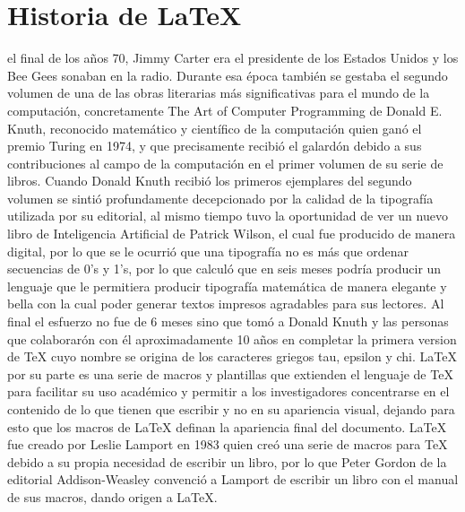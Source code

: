 \documentclass[journal]{IEEEtran}
\begin{document}
\section{Historia de \LaTeX }
% 
% 
% 
% 
 el final de los años 70, Jimmy Carter era el presidente de los Estados Unidos y los Bee Gees sonaban en la radio. Durante esa época también se gestaba el segundo volumen de  una de las obras literarias más significativas para el mundo de la computación, concretamente The Art of Computer Programming de Donald E. Knuth, reconocido matemático y científico de la computación quien ganó el premio Turing en 1974, y que precisamente recibió el galardón debido a sus contribuciones al campo de la computación en el primer volumen de su serie de libros.
Cuando Donald Knuth recibió los primeros ejemplares del segundo volumen se sintió profundamente decepcionado por la calidad de la tipografía utilizada por su editorial, al mismo tiempo tuvo la oportunidad de ver un nuevo libro de Inteligencia Artificial de Patrick Wilson, el cual fue producido de manera digital, por lo que se le ocurrió que una tipografía no es más que ordenar secuencias de 0’s y 1’s, por lo que calculó que en seis meses podría producir un lenguaje que le permitiera producir tipografía matemática de manera elegante y bella con la cual poder generar textos impresos agradables para sus lectores.
Al final el esfuerzo no fue de 6 meses sino que tomó a Donald Knuth y las personas que colaborarón con él aproximadamente 10 años en completar la primera version de TeX cuyo nombre se origina de los caracteres griegos tau, epsilon y chi\cite{ganguli_2013}.
LaTeX por su parte es una serie de macros y plantillas que extienden el lenguaje de TeX para facilitar su uso académico y permitir a los investigadores concentrarse en el contenido de lo que tienen que escribir y no en su apariencia visual, dejando para esto que los macros de LaTeX definan la apariencia final del documento. LaTeX fue creado por Leslie Lamport en 1983 quien creó una serie de macros para TeX debido a su propia necesidad de escribir un libro, por lo que Peter Gordon de la editorial Addison-Weasley convenció a Lamport de escribir un libro con el manual de sus macros, dando origen a \LaTeX\xspace . \cite{lamport_1994}
\end{document}
